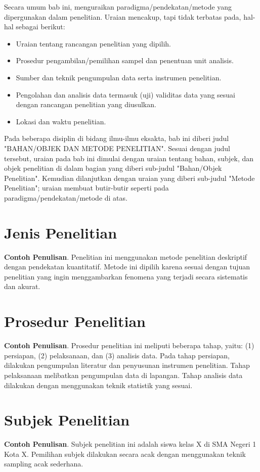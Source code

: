 Secara umum bab ini, menguraikan paradigma/pendekatan/metode yang dipergunakan dalam penelitian. Uraian mencakup, tapi tidak terbatas pada, hal-hal sebagai berikut:
\begin{itemize} 
\item Uraian tentang rancangan penelitian yang dipilih.
\item Prosedur pengambilan/pemilihan sampel dan penentuan unit analisis.
\item Sumber dan teknik pengumpulan data serta instrumen penelitian. 
\item Pengolahan dan analisis data termasuk (uji) validitas data yang sesuai dengan rancangan penelitian yang diusulkan. 
\item Lokasi dan waktu penelitian. 
\end{itemize}

Pada beberapa disiplin di bidang ilmu-ilmu eksakta, bab ini diberi judul "BAHAN/OBJEK DAN METODE PENELITIAN". Sesuai dengan judul tersebut, uraian pada bab ini dimulai dengan uraian tentang bahan, subjek, dan objek penelitian di dalam bagian yang diberi sub-judul "Bahan/Objek Penelitian". Kemudian dilanjutkan dengan uraian yang diberi sub-judul "Metode Penelitian"; uraian membuat butir-butir seperti pada paradigma/pendekatan/metode di atas.

\section{Jenis Penelitian}
\textbf{Contoh Penulisan}. Penelitian ini menggunakan metode penelitian deskriptif dengan pendekatan kuantitatif. Metode ini dipilih karena sesuai dengan tujuan penelitian yang ingin menggambarkan fenomena yang terjadi secara sistematis dan akurat.

\section{Prosedur Penelitian}
\textbf{Contoh Penulisan}. Prosedur penelitian ini meliputi beberapa tahap, yaitu: (1) persiapan, (2) pelaksanaan, dan (3) analisis data. Pada tahap persiapan, dilakukan pengumpulan literatur dan penyusunan instrumen penelitian. Tahap pelaksanaan melibatkan pengumpulan data di lapangan. Tahap analisis data dilakukan dengan menggunakan teknik statistik yang sesuai.

\section{Subjek Penelitian}
\textbf{Contoh Penulisan}. Subjek penelitian ini adalah siswa kelas X di SMA Negeri 1 Kota X. Pemilihan subjek dilakukan secara acak dengan menggunakan teknik sampling acak sederhana.

